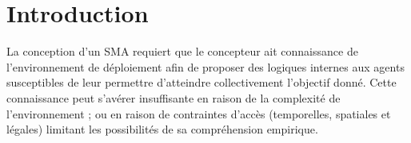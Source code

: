\documentclass[demonstration]{jfsma}
\newcommand{\jp}[1]{\textbf{\color{red} JPJ: #1}}
\begin{document}

\section{Introduction}







%


La conception d'un SMA requiert que le concepteur ait connaissance de l'environnement de déploiement afin de proposer des logiques internes aux agents susceptibles  de leur permettre d'atteindre collectivement l'objectif donné.
%
Cette connaissance peut s'avérer insuffisante en raison de la complexité de l'environnement ; ou en raison de contraintes d'accès (temporelles, spatiales et légales) limitant les possibilités de sa compréhension empirique.
\end{document}
